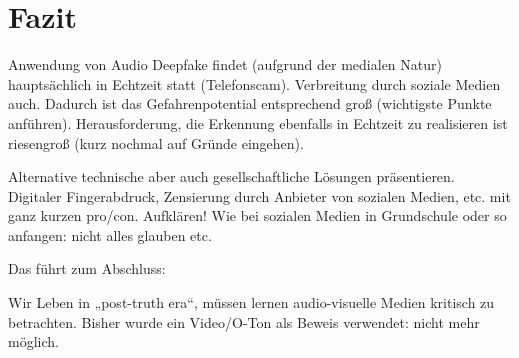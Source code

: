 \section{Fazit}
Anwendung von Audio Deepfake findet (aufgrund der medialen Natur) hauptsächlich in Echtzeit statt (Telefonscam).
Verbreitung durch soziale Medien auch.
Dadurch ist das Gefahrenpotential entsprechend groß (wichtigste Punkte anführen).
Herausforderung, die Erkennung ebenfalls in Echtzeit zu realisieren ist riesengroß (kurz nochmal auf Gründe eingehen).

Alternative technische aber auch gesellschaftliche Lösungen präsentieren.
Digitaler Fingerabdruck, Zensierung durch Anbieter von sozialen Medien, etc. mit ganz kurzen pro/con.
Aufklären! Wie bei sozialen Medien in Grundschule oder so anfangen: nicht alles glauben etc.

Das führt zum Abschluss:

Wir Leben in „post-truth era“, müssen lernen audio-visuelle Medien kritisch zu betrachten.
Bisher wurde ein Video/O-Ton als Beweis verwendet: nicht mehr möglich.